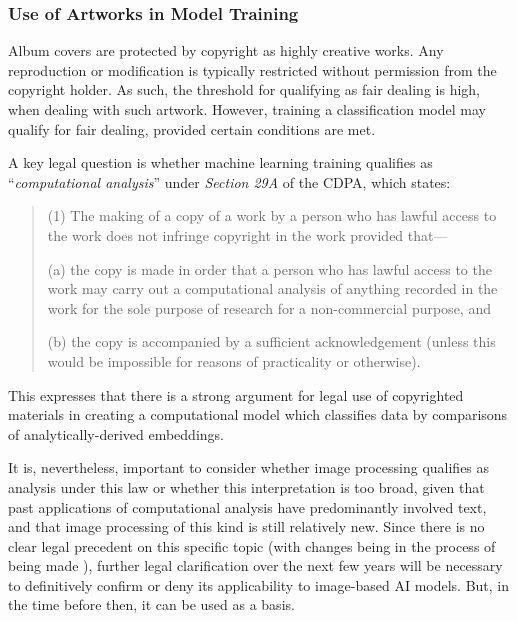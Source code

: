               \subsubsection{Use of Artworks in Model Training}
              
                  Album covers are protected by copyright as highly creative works. Any reproduction or modification is typically restricted without permission from the copyright holder. As such, the threshold for qualifying as fair dealing is high, when dealing with such artwork. However, training a classification model may qualify for fair dealing, provided certain conditions are met.
    
                  A key legal question is whether machine learning training qualifies as ``\textit{computational analysis}'' under \textit{Section 29A} of the CDPA, which states:
                  \begin{quote}
                      (1) The making of a copy of a work by a person who has lawful access to the work does not infringe copyright in the work provided that—
                  
                          (a) the copy is made in order that a person who has lawful access to the work may carry out a computational analysis of anything recorded in the work for the sole purpose of research for a non-commercial purpose, and
                          
                          (b) the copy is accompanied by a sufficient acknowledgement (unless this would be impossible for reasons of practicality or otherwise). \cite{cdpa1988}
                  \end{quote}
    
                  This expresses that there is a strong argument for legal use of copyrighted materials in creating a computational model which classifies data by comparisons of analytically-derived embeddings.
    
                  It is, nevertheless, important to consider whether image processing qualifies as analysis under this law or whether this interpretation is too broad, given that past applications of computational analysis have predominantly involved text, and that image processing of this kind is still relatively new. Since there is no clear legal precedent on this specific topic (with changes being in the process of being made \cite{guardian2024uk_ai_copyright}), further legal clarification over the next few years will be necessary to definitively confirm or deny its applicability to image-based AI models. But, in the time before then, it can be used as a basis.
    

